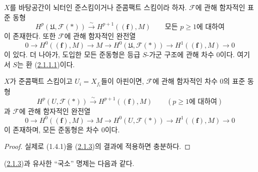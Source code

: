 \begin{proposition}[2.1.3]
\label{III.2.1.3-fr}
$X$를 바탕공간이 뇌터인 준스킴이거나 준콤팩트 스킴이라 하자.
$\mathcal F$에 관해 함자적인 표준 동형
\begin{equation}
\label{III.2.1.3.1-fr}
\tag{2.1.3.1}
H^p(\mathfrak U,\mathcal F(*))
\xrightarrow{\sim}H^{p+1}((\mathbf f),M)
\qquad\text{모든 }p\geq1\text{에 대하여}
\end{equation}
이 존재한다. 또한 $\mathcal F$에 관해 함자적인 완전열
\begin{equation}
\label{III.2.1.3.2-fr}
\tag{2.1.3.2}
0\longrightarrow H^0((\mathbf f),M)\longrightarrow M
\longrightarrow H^0(\mathfrak U,\mathcal F(*))
\longrightarrow H^1((\mathbf f),M)\longrightarrow0
\end{equation}
이 있다. 더 나아가, 도입한 모든 준동형은 등급 $S$-가군 구조에 관해
차수 $0$이다. 여기서 $S$는 환
(\hyperref[III.2.1.1.1-fr]{2.1.1.1})이다.
\end{proposition}

\providecommand{\bbGamma}{\boldsymbol{\Gamma}}
\providecommand{\shProj}{\mathcal{P}\mathrm{roj}}

\begin{corollary}[2.1.4]
\label{III.2.1.4-fr}
$X$가 준콤팩트 스킴이고 $U_i=X_{f_i}$들이 아핀이면,
$\mathcal F$에 관해 함자적인 차수 $0$의 표준 동형
\begin{equation}
\label{III.2.1.4.1-fr}
\tag{2.1.4.1}
H^p(U,\mathcal F(*))\xrightarrow{\sim}H^{p+1}((\mathbf f),M)
\qquad(p\geq1\text{에 대하여})
\end{equation}
과 $\mathcal F$에 관해 함자적인 완전열
\begin{equation}
\label{III.2.1.4.2-fr}
\tag{2.1.4.2}
0\longrightarrow H^0((\mathbf f),M)\longrightarrow M
\longrightarrow H^0(U,\mathcal F(*))
\longrightarrow H^1((\mathbf f),M)\longrightarrow0
\end{equation}
이 존재하며, 모든 준동형은 차수 $0$이다.
\end{corollary}

\begin{proof}
실제로 (1.4.1)을 (\hyperref[III.2.1.3-fr]{2.1.3})의 결과에 적용하면
충분하다.
\end{proof}

(\hyperref[III.2.1.3-fr]{2.1.3})과 유사한 ``국소'' 명제는 다음과 같다.

